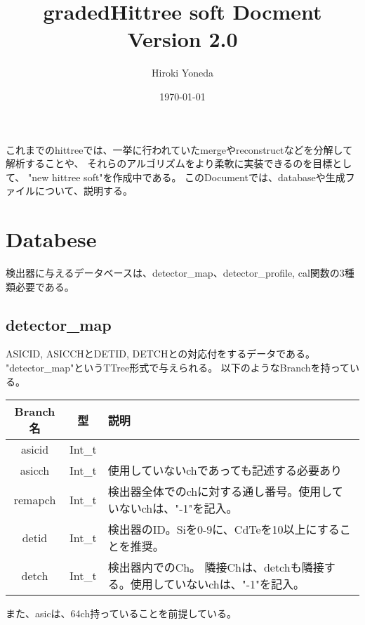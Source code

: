 \documentclass[10.5pt]{jsarticle}
\title{gradedHittree soft Docment \\
Version 2.0}
\author{Hiroki Yoneda}
\date{\today}
\begin{document}
 
\maketitle 

これまでのhittreeでは、一挙に行われていたmergeやreconstructなどを分解して解析することや、
それらのアルゴリズムをより柔軟に実装できるのを目標として、
"new hittree soft"を作成中である。
このDocumentでは、databaseや生成ファイルについて、説明する。

\section{Databese}
検出器に与えるデータベースは、detector\_map、detector\_profile, cal関数の3種類必要である。
\subsection{detector\_map}
ASICID, ASICCHとDETID, DETCHとの対応付をするデータである。
"detector\_map"というTTree形式で与えられる。
以下のようなBranchを持っている。
\begin{table}[htb]
  \begin{tabular}{|c|c|p{12cm}|} \hline
  Branch名 & 型 & 説明 \\ \hline
  asicid & Int\_t & \\
  asicch & Int\_t & 使用していないchであっても記述する必要あり\\
  remapch & Int\_t & 検出器全体でのchに対する通し番号。使用していないchは、"-1"を記入。\\
  detid & Int\_t  & 検出器のID。Siを0-9に、CdTeを10以上にすることを推奨。\\
  detch & Int\_t &  検出器内でのCh。 隣接Chは、detchも隣接する。使用していないchは、"-1"を記入。\\ \hline
  \end{tabular}
\end{table}
また、asicは、64ch持っていることを前提している。
\end{document}
